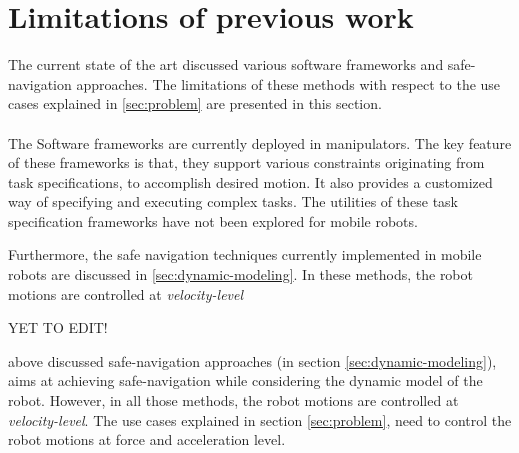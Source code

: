 \section{Limitations of previous work}
The current state of the art discussed various software frameworks and safe-navigation approaches. The limitations of these methods with respect to the use cases explained in \ref{sec:problem} are presented in this section. 

\paragraph{}The Software frameworks are currently deployed in manipulators. The key feature of these frameworks is that, they support various constraints originating from task specifications, to accomplish desired motion. It also provides a customized way of specifying and executing complex tasks. The utilities of these task specification frameworks have not been explored for mobile robots. 

Furthermore, the safe navigation techniques currently implemented in mobile robots are discussed in \ref{sec:dynamic-modeling}. In these methods, the robot motions are controlled at \textit{velocity-level}

YET TO EDIT!

above discussed safe-navigation approaches (in section \ref{sec:dynamic-modeling}), aims at achieving safe-navigation while considering the dynamic model of the robot. However, in all those methods, the robot motions are controlled at \textit{velocity-level}. The use cases explained in section \ref{sec:problem}, need to control the robot motions at force and acceleration level. 



